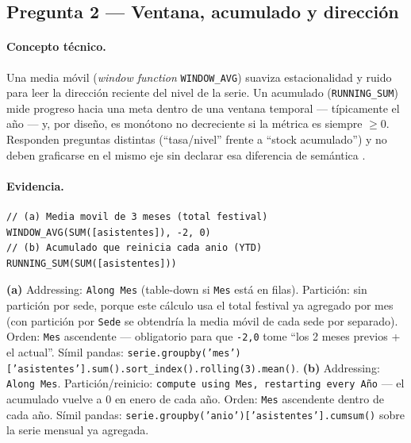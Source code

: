 \subsection{Pregunta 2 --- Ventana, acumulado y dirección}
\label{ssec:c3-q2}

\paragraph{Concepto técnico.}
Una media móvil (\emph{window function} \texttt{WINDOW\_AVG}) suaviza estacionalidad y ruido para leer la dirección reciente del nivel de la serie. Un acumulado (\texttt{RUNNING\_SUM}) mide progreso hacia una meta dentro de una ventana temporal --- típicamente el año --- y, por diseño, es monótono no decreciente si la métrica es siempre $\geq 0$. Responden preguntas distintas (\enquote{tasa/nivel} frente a \enquote{stock acumulado}) y no deben graficarse en el mismo eje sin declarar esa diferencia de semántica \citep{few2009now}.

\paragraph{Evidencia.}
\begin{lstlisting}[style=cod]
// (a) Media movil de 3 meses (total festival)
WINDOW_AVG(SUM([asistentes]), -2, 0)
// (b) Acumulado que reinicia cada anio (YTD)
RUNNING_SUM(SUM([asistentes]))
\end{lstlisting}
\textbf{(a)} Addressing: \texttt{Along Mes} (table-down si \texttt{Mes} está en filas). Partición: sin partición por sede, porque este cálculo usa el total festival ya agregado por mes (con partición por \texttt{Sede} se obtendría la media móvil de cada sede por separado). Orden: \texttt{Mes} ascendente --- obligatorio para que \texttt{-2,0} tome \enquote{los 2 meses previos + el actual}. Símil pandas: \texttt{serie.groupby('mes')['asistentes'].sum().sort\_index().rolling(3).mean()}.
\textbf{(b)} Addressing: \texttt{Along Mes}. Partición/reinicio: \texttt{compute using Mes, restarting every Año} --- el acumulado vuelve a 0 en enero de cada año. Orden: \texttt{Mes} ascendente dentro de cada año. Símil pandas: \texttt{serie.groupby('anio')['asistentes'].cumsum()} sobre la serie mensual ya agregada.

